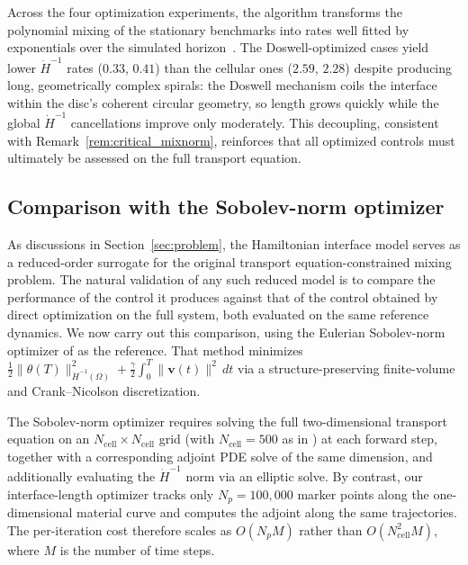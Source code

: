 \documentclass[12pt, reqno]{amsart}
\theoremstyle{plain}
\theoremstyle{definition}
\numberwithin{equation}{section}
\numberwithin{figure}{section}
\numberwithin{algorithm}{section}
\begin{document}
Across the four optimization experiments, the algorithm transforms the polynomial mixing of the stationary benchmarks into rates well fitted by exponentials over the simulated horizon~\cite{zheng2023numerical, hu2026structure}. The Doswell-optimized cases yield lower $\dot{H}^{-1}$ rates ($0.33$, $0.41$) than the cellular ones ($2.59$, $2.28$) despite producing long, geometrically complex spirals: the Doswell mechanism coils the interface within the disc's coherent circular geometry, so length grows quickly while the global $\dot{H}^{-1}$ cancellations improve only moderately. This decoupling, consistent with Remark~\ref{rem:critical_mixnorm}, reinforces that all optimized controls must ultimately be assessed on the full transport equation.

\subsection{Comparison with the Sobolev-norm optimizer}\label{sec:comparison}

As discussions in Section~\ref{sec:problem}, the Hamiltonian interface model serves as a reduced-order surrogate for the original transport equation-constrained mixing problem. The natural validation of any such reduced model is to compare the performance of the control it produces against that of the control obtained by direct optimization on the full system, both evaluated on the same reference dynamics. We now carry out this comparison, using the Eulerian Sobolev-norm optimizer of \cite{hu2026structure} as the reference. That method minimizes $\frac{1}{2}\|\theta(T)\|_{\dot{H}^{-1}(\Omega)}^2+\frac{\gamma}{2}\int_0^T\|\mathbf{v}(t)\|^2\,dt$ via a structure-preserving finite-volume and Crank--Nicolson discretization.

The Sobolev-norm optimizer requires solving the full two-dimensional transport equation on an $N_{\mathrm{cell}}\times N_{\mathrm{cell}}$ grid (with $N_{\mathrm{cell}}=500$ as in \cite{hu2026structure}) at each forward step, together with a corresponding adjoint PDE solve of the same dimension, and additionally evaluating the $\dot{H}^{-1}$ norm via an elliptic solve. By contrast, our interface-length optimizer tracks only $N_p=100{,}000$ marker points along the one-dimensional material curve and computes the adjoint along the same trajectories. The per-iteration cost therefore scales as $O(N_p M)$ rather than $O(N_{\mathrm{cell}}^2 M)$, where $M$ is the number of time steps.
\end{document}
